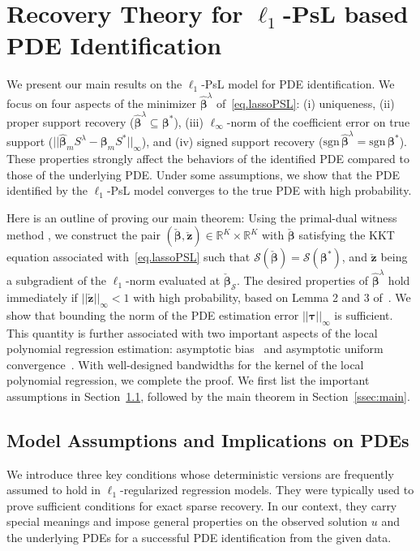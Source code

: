 \documentclass[a4paper,11pt]{article}
\newcommand{\btau}{\bm{\tau}}
\newcommand{\bbeta}{\bm{\beta}}
\newcommand{\mS}{\mathcal{S}}
\theoremstyle{definition}
\newcommand{\mei}[1]{\color{blue}{#1 }\color{black}}
\begin{document}
\section{Recovery Theory for $\ell_1$-PsL based PDE Identification} \label{sec:main}

We present our main results on the $\ell_1$-PsL model for PDE identification. We focus on four aspects of the minimizer $\widehat{\bbeta}^\lambda$ of~\eqref{eq.lassoPSL}: (i) uniqueness, (ii) proper support recovery ($\widehat{\bbeta}^\lambda\subseteq\bbeta^*$), (iii) $\ell_\infty$-norm of the coefficient error on true support ($||\widehat{\bbeta}_mS^\lambda-\bbeta_mS^*||_\infty$), and (iv) signed support recovery ($\text{sgn}\,\widehat{\bbeta}^\lambda=\text{sgn}\,\bbeta^*$). These properties strongly affect the behaviors of the identified PDE compared to those of the underlying PDE.   Under some assumptions, we show that the PDE identified by the $\ell_1$-PsL model converges to the true PDE with high probability.

Here is an outline of proving our main theorem:  Using the primal-dual witness method \cite{wainwright2009sharp}, we construct the pair $(\check{\bbeta},\check{\mathbf{z}})\in\mathbb{R}^{K}\times\mathbb{R}^{K}$ with $\check{\bbeta}$ satisfying the KKT equation associated with~\eqref{eq.lassoPSL} such that $\mS(\check{\bbeta})=\mS(\bbeta^*)$, and $\check{\mathbf{z}}$ being a subgradient of the $\ell_1$-norm evaluated at $\check{\bbeta}_\mS$.   The desired properties of $\widehat{\bbeta}^\lambda$ hold immediately if $||\check{\mathbf{z}}||_\infty<1$ with high probability, based on Lemma 2 and 3 of~\cite{wainwright2009sharp}. We show that bounding the norm of the PDE estimation error  $||\btau||_\infty$ is sufficient. This quantity is further associated with two important aspects of the local polynomial regression estimation: asymptotic bias~\cite{fan1997local} and asymptotic uniform convergence~\cite{mack1982weak}. With well-designed bandwidths for the kernel of the local polynomial regression, we complete the proof.  We first list the  important assumptions in Section~\ref{sec.assumptions}, followed by the main theorem in Section~\ref{ssec:main}.



\subsection{Model Assumptions and Implications on PDEs}\label{sec.assumptions}

We introduce three key conditions whose deterministic versions are frequently assumed to hold in $\ell_1$-regularized regression models. They were typically used to prove sufficient conditions for exact sparse recovery. In our context, they carry special meanings and impose general properties on the observed solution $u$ and the underlying PDEs for a successful PDE identification from the given data. \mei{In the next section, we will provide more detailed discussions on these three key conditions, and provide deeper insights under in the PDE setting.}
\end{document}
